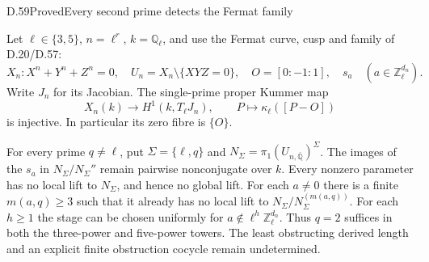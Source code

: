 \begin{statement}{D.59}{Proved}{Every second prime detects the Fermat family}

Let $\ell\in\{3,5\}$, $n=\ell^r$, $k=\mathbb Q_\ell$,
and use the Fermat curve, cusp and family of D.20/D.57:
\[
 X_n:X^n+Y^n+Z^n=0,\quad
 U_n=X_n\setminus\{XYZ=0\},\quad O=[0:-1:1],\quad
 s_a\quad(a\in\mathbb Z_\ell^{d_n}).
\]
Write $J_n$ for its Jacobian.  The single-prime proper Kummer map
\[
 X_n(k)\longrightarrow H^1(k,T_\ell J_n),\qquad
                   P\longmapsto\kappa_\ell([P-O])       \tag{D.59.1}
\]
is injective.  In particular its zero fibre is $\{O\}$.

For every prime $q\ne\ell$, put $\Sigma=\{\ell,q\}$ and
$N_\Sigma=\pi_1(U_{n,\overline{\mathbb Q}})^\Sigma$.
The images of the $s_a$ in $N_\Sigma/N_\Sigma''$ remain
pairwise nonconjugate over $k$.  Every nonzero parameter
has no local lift to $N_\Sigma$, and hence no global lift.
For each $a\ne0$ there is a finite $m(a,q)\ge3$ such that
it already has no local lift to
$N_\Sigma/N_\Sigma^{(m(a,q))}$.  For each $h\ge1$ the
stage can be chosen uniformly for
$a\notin\ell^h\mathbb Z_\ell^{d_n}$.
Thus $q=2$ suffices in both the three-power and five-power
towers.  The least obstructing derived length and an
explicit finite obstruction cocycle remain undetermined.

\end{statement}
